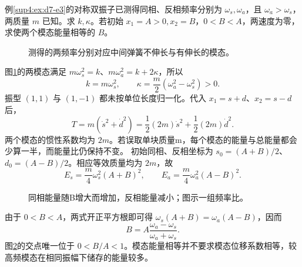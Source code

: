 \begin{exercise}[由频率求弹簧与模态能量]\label{deep4:problem-exercise-3}\label{deep4:ex:d7-h3}
例\ref{sup4:ex:d7-e3}的对称双振子已测得同相、反相频率分别为 $\omega_s,\omega_a$，且 $\omega_a>\omega_s$，两质量 $m$ 已知。求 $k,\kappa$。若初始 $x_1=A>0,x_2=B$，$0<B<A$，两速度为零，求使两个模态能量相等的 $B$。
\end{exercise}
\begin{figure}[H]\centering
{}
\caption{测得的两频率分别对应中间弹簧不伸长与有伸长的模态。}\label{deep4:fig:d7-h3-q}
\end{figure}
\begin{solution}
图\ref{deep4:fig:d7-h3-q}的两模态满足 $m\omega_s^2=k$、$m\omega_a^2=k+2\kappa$，所以
\[
\boxed{k=m\omega_s^2,\qquad \kappa=\frac m2(\omega_a^2-\omega_s^2)>0.}
\]
振型 $(1,1)$ 与 $(1,-1)$ 都未按单位长度归一化。代入 $x_1=s+d$、$x_2=s-d$ 后，
\[
T=m(\dot s^2+\dot d^2)
=\frac12(2m)\dot s^2+\frac12(2m)\dot d^2.
\]
两个模态的惯性系数均为 $2m$。若误取单块质量m，每个模态的能量与总能量都会少算一半，而能量比仍保持不变。
初始同相、反相坐标为 $s_0=(A+B)/2$、$d_0=(A-B)/2$。相应等效质量均为 $2m$，故
\[
E_s=\frac m4\omega_s^2(A+B)^2,\qquad
E_a=\frac m4\omega_a^2(A-B)^2.
\]
\begin{figure}[H]\centering
{}
\caption{同相能量随B增大而增加，反相能量减小；图示一组频率比。}\label{deep4:fig:d7-h3-s}
\end{figure}
由于 $0<B<A$，两式开正平方根即可得 $\omega_s(A+B)=\omega_a(A-B)$，因而
\[
\boxed{B=A\frac{\omega_a-\omega_s}{\omega_a+\omega_s}.}
\]
图\ref{deep4:fig:d7-h3-s}的交点唯一位于 $0<B/A<1$。模态能量相等并不要求模态位移系数相等，较高频模态在相同振幅下储存的能量较多。
\end{solution}


